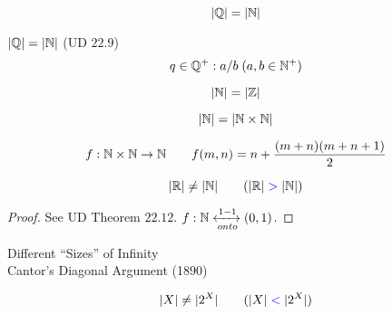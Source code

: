 \begin{frame}{}
  \begin{theorem}[$\aleph_0$ (1874)]
    \[
      |\mathbb{Q}| = |\mathbb{N}|
    \]
  \end{theorem}

  \pause
  \begin{exampleblock}{$|\mathbb{Q}| = |\mathbb{N}|$ (UD $22.9$)}
    \[
      q \in \mathbb{Q}^{+}: a / b \; (a,b \in \mathbb{N}^{+})
    \]
  \end{exampleblock}
\end{frame}

\begin{frame}{}
  \[
    |\mathbb{N}| = |\mathbb{Z}|
  \]

  \pause
  \[
    |\mathbb{N}| = |\mathbb{N} \times \mathbb{N}|
  \]

  \pause
  \[
    f: \mathbb{N} \times \mathbb{N} \to \mathbb{N} \qquad f(m,n) = n + \frac{(m+n)(m+n+1)}{2}
  \]
\end{frame}

\begin{frame}{}
  \begin{theorem}
    \[
      |\mathbb{R}| \neq |\mathbb{N}| \qquad (|\mathbb{R}| \;\textcolor{blue}{>}\; |\mathbb{N}|)
    \]
  \end{theorem}

  \pause
  \begin{proof}
    \centerline{See UD Theorem $22.12$. $f: \mathbb{N} \xleftrightarrow[onto]{1-1} (0,1)$.}
  \end{proof}

  \pause
  \vspace{0.30cm}
  \begin{center}
    Different ``Sizes'' of Infinity \\[10pt] \pause
    Cantor's Diagonal Argument (1890)
  \end{center}

  \pause
  \vspace{0.20cm}
  \begin{theorem}
    \[
      |X| \neq |2^{X}| \qquad (|X| \;\textcolor{blue}{<}\; |2^{X}|)
    \]
  \end{theorem}
\end{frame}

